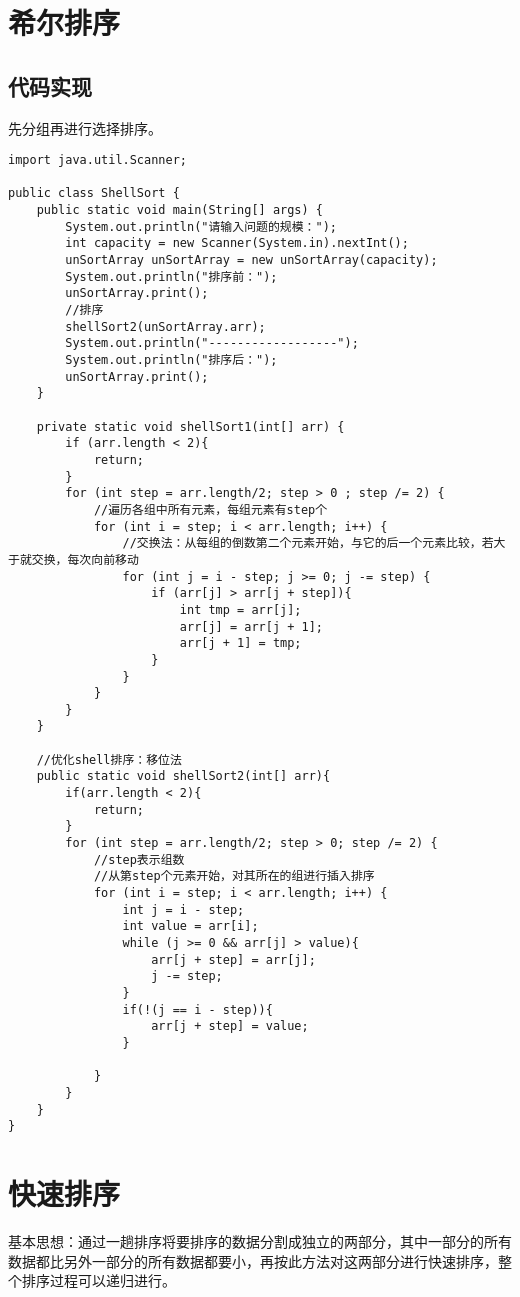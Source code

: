 \documentclass[a4paper]{report}
\begin{document}
\section{希尔排序}

\subsection{代码实现}
先分组再进行选择排序。
\begin{lstlisting}
import java.util.Scanner;

public class ShellSort {
    public static void main(String[] args) {
        System.out.println("请输入问题的规模：");
        int capacity = new Scanner(System.in).nextInt();
        unSortArray unSortArray = new unSortArray(capacity);
        System.out.println("排序前：");
        unSortArray.print();
        //排序
        shellSort2(unSortArray.arr);
        System.out.println("------------------");
        System.out.println("排序后：");
        unSortArray.print();
    }

    private static void shellSort1(int[] arr) {
        if (arr.length < 2){
            return;
        }
        for (int step = arr.length/2; step > 0 ; step /= 2) {
            //遍历各组中所有元素，每组元素有step个
            for (int i = step; i < arr.length; i++) {
                //交换法：从每组的倒数第二个元素开始，与它的后一个元素比较，若大于就交换，每次向前移动
                for (int j = i - step; j >= 0; j -= step) {
                    if (arr[j] > arr[j + step]){
                        int tmp = arr[j];
                        arr[j] = arr[j + 1];
                        arr[j + 1] = tmp;
                    }
                }
            }
        }
    }

    //优化shell排序：移位法
    public static void shellSort2(int[] arr){
        if(arr.length < 2){
            return;
        }
        for (int step = arr.length/2; step > 0; step /= 2) {
            //step表示组数
            //从第step个元素开始，对其所在的组进行插入排序
            for (int i = step; i < arr.length; i++) {
                int j = i - step;
                int value = arr[i];
                while (j >= 0 && arr[j] > value){
                    arr[j + step] = arr[j];
                    j -= step;
                }
                if(!(j == i - step)){
                    arr[j + step] = value;
                }

            }
        }
    }
}
\end{lstlisting}
\section{快速排序}
基本思想：通过一趟排序将要排序的数据分割成独立的两部分，其中一部分的所有数据都比另外一部分的所有数据都要小，再按此方法对这两部分进行快速排序，整个排序过程可以递归进行。
\end{document}
